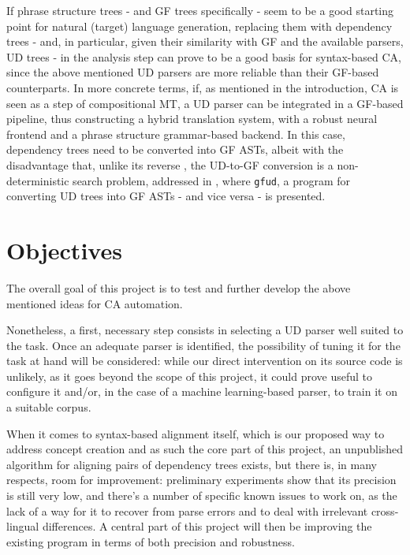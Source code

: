 \documentclass{article}
\begin{document}

If phrase structure trees - and GF trees specifically - seem to be a good starting point for natural (target) language generation, replacing them with dependency trees - and, in particular, given their similarity with GF and the available parsers, UD trees - in the analysis step can prove to be a good basis for syntax-based CA, since the above mentioned UD parsers are more reliable than their GF-based counterparts.
In more concrete terms, if, as mentioned in the introduction, CA is seen as a step of compositional MT, a UD parser can be integrated in a GF-based pipeline, thus constructing a hybrid translation system, with a robust neural frontend and a phrase structure grammar-based backend. 
In this case, dependency trees need to be converted into GF ASTs, albeit with the disadvantage that, unlike its reverse \cite{gfud}, the UD-to-GF conversion is a non-deterministic search problem, addressed in \cite{udgf}, where \texttt{gfud}, a program for converting UD trees into GF ASTs - and vice versa - is presented. 

\section{Objectives} \label{objs}
The overall goal of this project is to test and further develop the above mentioned ideas for CA automation. 

Nonetheless, a first, necessary step consists in selecting a UD parser well suited to the task. 
Once an adequate parser is identified, the possibility of tuning it for the task at hand will be considered: while our direct intervention on its source code is unlikely, as it goes beyond the scope of this project, it could prove useful to configure it and/or, in the case of a machine learning-based parser, to train it on a suitable corpus.

When it comes to syntax-based alignment itself, which is our proposed way to address concept creation and as such the core part of this project, an unpublished algorithm for aligning pairs of dependency trees exists, but there is, in many respects, room for improvement: preliminary experiments show that its precision is still very low, and there's a number of specific known issues to work on, as the lack of a way for it to recover from parse errors and to deal with irrelevant cross-lingual differences.
A central part of this project will then be improving the existing program in terms of both precision and robustness.
\end{document}
